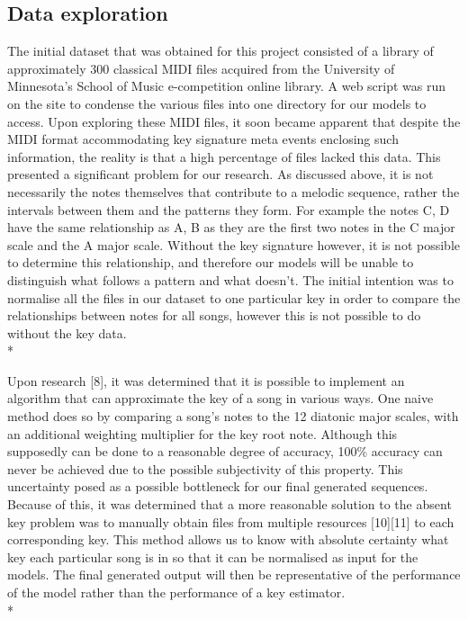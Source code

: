 \documentclass[12pt]{article}
\begin{document}
\subsection*{Data exploration}
  \begin{flushright}
    \begin{minipage}[t]{0.96\linewidth}

    The initial dataset that was obtained for this project consisted of a library of approximately 300 classical MIDI files acquired from the University of Minnesota's School of Music e-competition online library. A web script was run on the site to condense the various files into one directory for our models to access. Upon exploring these MIDI files, it soon became apparent that despite the MIDI format accommodating key signature meta events enclosing such information, the reality is that a high percentage of files lacked this data. This presented a significant problem for our research. As discussed above, it is not necessarily the notes themselves that contribute to a melodic sequence, rather the intervals between them and the patterns they form. For example the notes C, D have the same relationship as A, B as they are the first two notes in the C major scale and the A major scale. Without the key signature however, it is not possible to determine this relationship, and therefore our models will be unable to distinguish what follows a pattern and what doesn't. The initial intention was to normalise all the files in our dataset to one particular key in order to compare the relationships between notes for all songs, however this is not possible to do without the key data. \\*

    Upon research [8], it was determined that it is possible to implement an algorithm that can approximate the key of a song in various ways. One naive method does so by comparing a song's notes to the 12 diatonic major scales, with an additional weighting multiplier for the key root note. Although this supposedly can be done to a reasonable degree of accuracy, 100\% accuracy can never be achieved due to the possible subjectivity of this property.  This uncertainty posed as a possible bottleneck for our final generated sequences. Because of this, it was determined that a more reasonable solution to the absent key problem was to manually obtain files from multiple resources [10][11] to each corresponding key. This method allows us to know with absolute certainty what key each particular song is in so that it can be normalised as input for the models. The final generated output will then be representative of the performance of the model rather than the performance of a key estimator. \\*


\end{minipage}
\end{flushright}
\end{document}

